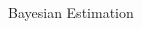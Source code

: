 \documentclass{beamer}
\newcommand{\vect}{\bf}
\theoremstyle{remark}
\newcommand{\XX}[3][2]{\mathbf{X}_{\tiny #2}^{\tiny #3}}
\newcommand{\pr}{\textrm{p}}
\newcommand{\bIn}{\boldsymbol{I}_{\boldsymbol{n}}}
\newcommand{\bIk}{\boldsymbol{I}_{\boldsymbol{k}}}
\newcommand{\bIkk}{\boldsymbol{I}_{\boldsymbol{k-1}}}
\newcommand{\zz}[3][2]{\mathbf{z}_{ #2}^{ #3}}
\begin{document}
\begin{frame}{Bayesian Estimation}
\begin{columns}
\begin{column}{.48\textwidth}
			

		\end{column}
				
	\end{columns}
			
	
	
	
	
%		
\end{frame}
	
	
	
\end{document}
